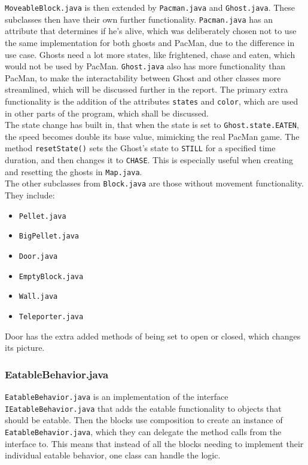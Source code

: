 \documentclass[a4paper,5pt]{article}
\begin{document}
\texttt{MoveableBlock.java} is then extended by \texttt{Pacman.java} and \texttt{Ghost.java}. These subclasses then have their own further functionality. \texttt{Pacman.java} has an attribute that determines if he's alive, which was deliberately chosen not to use the same implementation for both ghosts and PacMan, due to the difference in use case. Ghosts need a lot more states, like frightened, chase and eaten, which would not be used by PacMan.  \texttt{Ghost.java} also has more functionality than PacMan, to make the interactability between Ghost and other classes more streamlined, which will be discussed further in the report. The primary extra functionality is the addition of the attributes \texttt{states} and \texttt{color}, which are used in other parts of the program, which shall be discussed. \\The state change has built in, that when the state is set to \texttt{Ghost.state.EATEN}, the speed becomes double its base value, mimicking the real PacMan game. The method \texttt{resetState()} sets the Ghost's state to \texttt{STILL} for a specified time duration, and then changes it to \texttt{CHASE}. This is especially useful when creating and resetting the ghosts in \texttt{Map.java}.
\\ The other subclasses from \texttt{Block.java} are those without movement functionality. They include:
\begin{itemize}
    \item \texttt{Pellet.java}
    \item \texttt{BigPellet.java}
    \item \texttt{Door.java}
    \item \texttt{EmptyBlock.java}
    \item \texttt{Wall.java}
    \item \texttt{Teleporter.java}
\end{itemize}
Door has the extra added methods of being set to open or closed, which changes its picture.

\subsubsection{EatableBehavior.java}
\texttt{EatableBehavior.java} is an implementation of the interface \texttt{IEatableBehavior.java} that adds the eatable functionality to objects that should be eatable. Then the blocks use composition to create an instance of \texttt{EatableBehavior.java}, which they can delegate the method calls from the interface to. This means that instead of all the blocks needing to implement their individual eatable behavior, one class can handle the logic. 
\end{document}
